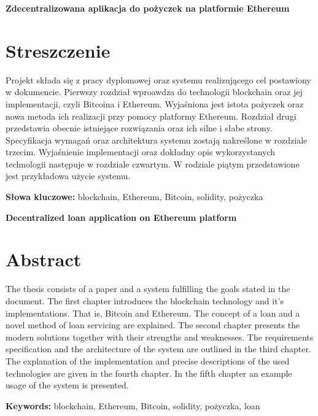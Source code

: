 \newpage
\begin{center}
\large \bf
Zdecentralizowana aplikacja do pożyczek na platformie Ethereum
\end{center}

\section*{Streszczenie}
Projekt składa się z pracy dyplomowej oraz systemu realizującego cel postawiony w dokumencie.
Pierwszy rozdział wproawdza do technologii blockchain oraz jej implementacji, czyli Bitcoina i Ethereum. Wyjaśniona jest istota pożyczek oraz nowa metoda ich realizacji przy pomocy platformy Ethereum. Rozdział drugi przedstawia obecnie istniejące rozwiązania oraz ich silne i słabe strony. Specyfikacja wymagań oraz architektura systemu zostają nakreślone w rozdziale trzecim. Wyjaśnienie implementacji oraz dokładny opis wykorzystanych technologii następuje w rozdziale czwartym. W rodziale piątym przedstawione jest przykładowa użycie systemu.

\bigskip
{\noindent\bf Słowa kluczowe:} blockchain, Ethereum, Bitcoin, solidity, pożyczka

\vskip 2cm


\begin{center}
\large \bf
Decentralized loan application on Ethereum platform
\end{center}

\section*{Abstract}

The thesis consists of a paper and a system fulfilling the goals stated in the document. The first chapter introduces the blockchain technology and it's implementations. That is, Bitcoin and Ethereum. The concept of a loan and a novel method of loan servicing are explained. The second chapter presents the modern solutions together with their strengths and weaknesses.  The requirements specification and the architecture of the system are outlined in the third chapter. The explanation of the implementation and precise descriptions of the used technologies are given in the fourth chapter. In the fifth chapter an example usage of the system is presented.

\bigskip
{\noindent\bf Keywords:} blockchain, Ethereum, Bitcoin, solidity, pożyczka, loan

\vfill